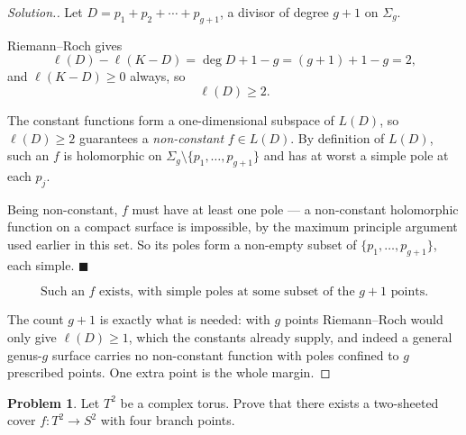 \documentclass[11pt,a4paper]{article}
\theoremstyle{definition}
\newtheorem{problemx}{Problem}[section]
\newenvironment{problem}{\begin{problemx}}{\end{problemx}}
\newenvironment{solution}
  {\renewcommand{\qedsymbol}{}\begin{proof}[\textit{Solution}.]}
  {\end{proof}}
\begin{document}
\begin{solution}
Let $D = p_1 + p_2 + \cdots + p_{g+1}$, a divisor of degree $g+1$ on
$\Sigma_g$.

Riemann--Roch gives
$$\ell(D) - \ell(K-D) = \deg D + 1 - g = (g+1) + 1 - g = 2 ,$$
and $\ell(K-D) \geq 0$ always, so
$$\ell(D) \geq 2 .$$

The constant functions form a one-dimensional subspace of $L(D)$, so
$\ell(D) \geq 2$ guarantees a \emph{non-constant} $f \in L(D)$. By definition of
$L(D)$, such an $f$ is holomorphic on $\Sigma_g \setminus \{p_1,\ldots,p_{g+1}\}$
and has at worst a simple pole at each $p_j$.

Being non-constant, $f$ must have at least one pole --- a non-constant holomorphic
function on a compact surface is impossible, by the maximum principle argument used
earlier in this set. So its poles form a non-empty subset of
$\{p_1,\ldots,p_{g+1}\}$, each simple. $\blacksquare$

$$\boxed{\text{Such an } f \text{ exists, with simple poles at some subset of the }
g+1 \text{ points.}}$$

The count $g+1$ is exactly what is needed: with $g$ points Riemann--Roch would only
give $\ell(D) \geq 1$, which the constants already supply, and indeed a general
genus-$g$ surface carries no non-constant function with poles confined to $g$
prescribed points. One extra point is the whole margin.
\end{solution}


\begin{problem}
Let $T^{2}$ be a complex torus. Prove that there exists a two-sheeted cover
$f : T^{2} \rightarrow S^{2}$ with four branch points.
\end{problem}
\end{document}
